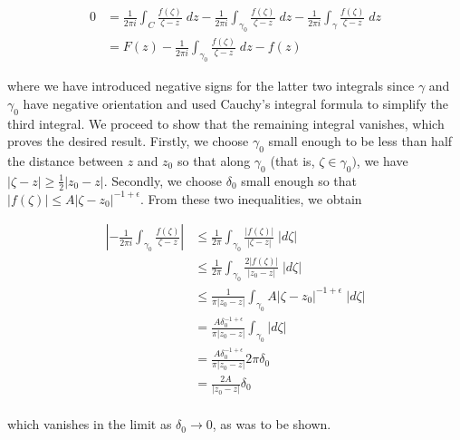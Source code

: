 \begin{solution}
  \begin{align*}
  0 &= \frac{1}{2 \pi i} \int_{C}{\frac{f(\zeta)}{\zeta - z} \; dz} 
     - \frac{1}{2 \pi i} \int_{\gamma_0}{\frac{f(\zeta)}{\zeta - z} \; dz}
     - \frac{1}{2 \pi i} \int_{\gamma}{\frac{f(\zeta)}{\zeta - z} \; dz} \\
    &= F(z) - \frac{1}{2 \pi i} \int_{\gamma_0}{\frac{f(\zeta)}{\zeta - z} \; dz} - f(z)
  \end{align*}

  where we have introduced negative signs for the latter two integrals since $\gamma$ and $\gamma_0$ have negative 
  orientation and used Cauchy's integral formula to simplify the third integral. We proceed to show that the remaining 
  integral vanishes, which proves the desired result. Firstly, we choose $\gamma_0$ small enough to be less than half 
  the distance between $z$ and $z_0$ so that along $\gamma_0$ (that is, $\zeta \in \gamma_0)$, we have 
  $|\zeta - z| \ge \frac{1}{2}|z_0 - z|$. Secondly, we choose $\delta_0$ small enough so that 
  $|f(\zeta)| \le A |\zeta - z_0|^{-1 + \epsilon}$. From these two inequalities, we obtain

  \begin{align*}
    \left| -\frac{1}{2 \pi i} \int_{\gamma_0} \frac{f(\zeta)}{\zeta - z} \right|
    &\le \frac{1}{2 \pi} \int_{\gamma_0} \frac{|f(\zeta)|}{|\zeta - z|} \; |d\zeta| \\
    &\le \frac{1}{2 \pi} \int_{\gamma_0} \frac{2 |f(\zeta)|}{|z_0 - z|} \; |d\zeta| \\
    &\le \frac{1}{\pi |z_0 - z|} \int_{\gamma_0} {A |\zeta - z_0|^{-1 + \epsilon}} \; |d\zeta| \\
    &= \frac{A \delta_0^{-1 + \epsilon}}{\pi |z_0 - z|} \int_{\gamma_0} {|d\zeta|}  \\
    &= \frac{A \delta_0^{-1 + \epsilon}}{\pi |z_0 - z|} 2 \pi \delta_0 \\
    &= \frac{2 A }{|z_0 - z|} \delta_0 \\
  \end{align*}

  which vanishes in the limit as $\delta_0 \to 0$, as was to be shown.
  \ \\
\end{solution}